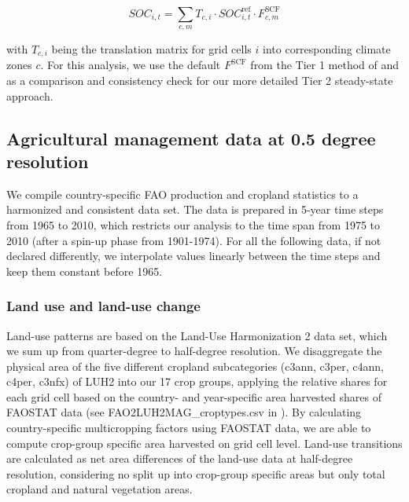 \documentclass[gc, manuscript]{copernicus}
\begin{document}
\begin{equation}
SOC_{i,t} = \sum_{c,m} T_{c,i} \cdot SOC^{\mathrm{ref}}_{i,t} \cdot F^{\mathrm{SCF}}_{c,m}
\label{eq:tier1}
\end{equation}

with \(T_{c,i}\) being the translation matrix for grid cells \(i\) into corresponding climate zones \(c\). For this analysis, we use the default \(F^{\mathrm{SCF}}\) from the Tier 1 method of \citep{eggleston_ipcc_2006} and \citep{calvo_buendia_ipcc_2019} as a comparison and consistency check for our more detailed Tier 2 steady-state approach.

\hypertarget{sec:agrimanagement}{%
\subsection{Agricultural management data at 0.5 degree resolution}\label{sec:agrimanagement}}

We compile country-specific FAO production and cropland statistics \citep{faostat_faostat_2016} to a harmonized and consistent data set. The data is prepared in 5-year time steps from 1965 to 2010, which restricts our analysis to the time span from 1975 to 2010 (after a spin-up phase from 1901-1974). For all the following data, if not declared differently, we interpolate values linearly between the time steps and keep them constant before 1965.

\hypertarget{sec:landuse}{%
\subsubsection{Land use and land-use change}\label{sec:landuse}}

Land-use patterns are based on the Land-Use Harmonization 2 \citep{hurtt_harmonization_2020} data set, which we sum up from quarter-degree to half-degree resolution. We disaggregate the physical area of the five different cropland subcategories (c3ann, c3per, c4ann, c4per, c3nfx) of LUH2 into our 17 crop groups, applying the relative shares for each grid cell based on the country- and year-specific area harvested shares of FAOSTAT data \citep{faostat_faostat_2016} (see FAO2LUH2MAG\_croptypes.csv in \citep{bodirsky_mrcommons_2020}). By calculating country-specific multicropping factors using FAOSTAT data, we are able to compute crop-group specific area harvested on grid cell level.
Land-use transitions are calculated as net area differences of the land-use data at half-degree resolution, considering no split up into crop-group specific areas but only total cropland and natural vegetation areas.
\end{document}

